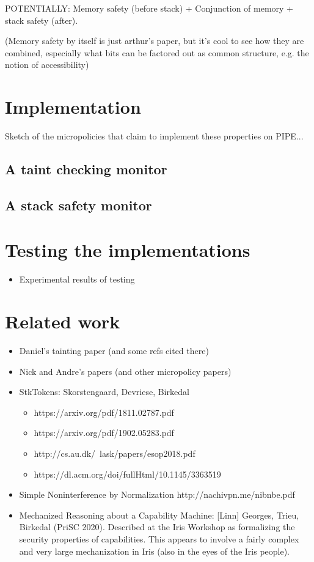 \documentclass[conference]{IEEEtran}
\begin{document}
POTENTIALLY: Memory safety (before stack) + Conjunction of memory + stack
safety (after).

(Memory safety by itself is just arthur’s paper, but it’s cool to see how
they are combined, especially what bits can be factored out as common
structure, e.g. the notion of accessibility)
\fi

\section{Implementation}
\label{impl}

Sketch of the micropolicies that claim to implement these properties on
PIPE...

\subsection{A taint checking monitor}

\subsection{A stack safety monitor}

\section{Testing the implementations}

\begin{itemize}
\item Experimental results of testing
\end{itemize}

\section{Related work}

\begin{itemize}
\item Daniel's tainting paper (and some refs cited there)
\item Nick and Andre's papers (and other micropolicy papers)
\item StkTokens: Skorstengaard, Devriese, Birkedal
\begin{itemize}
\item {https://arxiv.org/pdf/1811.02787.pdf}
\item {https://arxiv.org/pdf/1902.05283.pdf}
\item {http://cs.au.dk/~lask/papers/esop2018.pdf}
\item {https://dl.acm.org/doi/fullHtml/10.1145/3363519}
\end{itemize}

\item Simple Noninterference by Normalization {http://nachivpn.me/nibnbe.pdf}

\item Mechanized Reasoning about a Capability Machine: [Linn] Georges,
Trieu, Birkedal (PriSC 2020).
%
Described at the Iris Workshop as formalizing the security properties of
capabilities. This appears to involve a fairly complex and very large
mechanization in Iris (also in the eyes of the Iris people).
\end{itemize}
\end{document}
